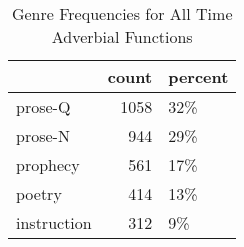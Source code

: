 \begin{table}[htbp!]
\centering
\caption{Genre Frequencies for All Time Adverbial Functions}
\label{table:all_genre_cp}
\begin{tabular}{lrl}
\toprule
{} &  count & percent \\
\midrule
prose-Q     &   1058 &     32\% \\
prose-N     &    944 &     29\% \\
prophecy    &    561 &     17\% \\
poetry      &    414 &     13\% \\
instruction &    312 &      9\% \\
\bottomrule
\end{tabular}
\end{table}

